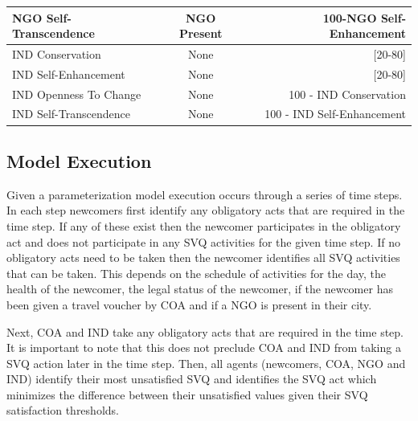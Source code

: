\documentclass{scspaperproc}
\theoremstyle{scsthe}
\begin{document}
\begin{table}[ht]
\begin{center}
{\begin{tabular}{|lcr|}
\hline
NGO Self-Transcendence                                                                                      & NGO Present           &  100-NGO Self-Enhancement   \\
\hline
IND Conservation                                                                                            & None                  & {[}20-80{]}                \\
\hline
IND Self-Enhancement                                                                                        & None                  & {[}20-80{]}                \\
\hline
IND Openness To Change                                                                                      & None                  &  100 - IND Conservation     \\
\hline
IND Self-Transcendence                                                                                      & None                  &  100 - IND Self-Enhancement \\
\hline
\end{tabular}}
\end{center}
\end{table}

\subsection{Model Execution}
Given a parameterization model execution occurs through a series of time steps. In each step newcomers first identify any obligatory acts that are required in the time step. If any of these exist then the newcomer participates in the obligatory act and does not participate in any SVQ activities for the given time step. If no obligatory acts need to be taken then the newcomer identifies all SVQ activities that can be taken. This depends on the schedule of activities for the day, the health of the newcomer, the legal status of the newcomer, if the newcomer has been given a travel voucher by COA and if a NGO is present in their city. 

Next, COA and IND take any obligatory acts that are required in the time step. It is important to note that this does not preclude COA and IND from taking a SVQ action later in the time step. Then, all agents (newcomers, COA, NGO and IND) identify their most unsatisfied SVQ and identifies the SVQ act which minimizes the difference between their unsatisfied values given their SVQ satisfaction thresholds. %
\end{document}
